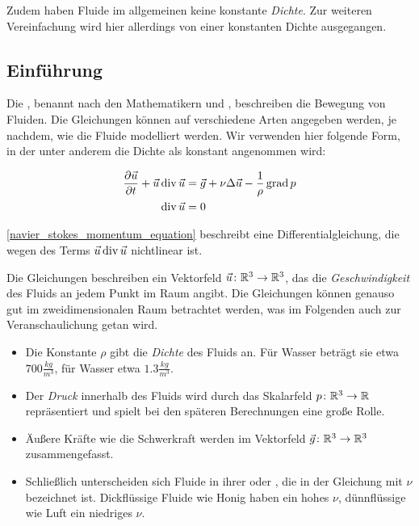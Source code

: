 Zudem haben Fluide im allgemeinen keine konstante \emph{Dichte}. Zur weiteren
Vereinfachung wird hier allerdings von einer konstanten Dichte ausgegangen.

\subsection{Einführung}

Die , benannt nach den Mathematikern
 und ,
beschreiben die Bewegung von Fluiden. Die Gleichungen können auf verschiedene
Arten angegeben werden, je nachdem, wie die Fluide modelliert werden. Wir
verwenden hier folgende Form, in der unter anderem die Dichte als konstant
angenommen wird:

\begin{align}
\label{navier_stokes_momentum_equation}
\frac{
	\partial
	\vec{u}
}
{
	\partial t
} +
\vec{u} \operatorname*{div} \vec{u}
& =
\vec{g} +
\nu \Delta \vec{u} -
\frac{
	1
}
{
	\rho
}
\operatorname*{grad} p
\\
\label{navier_stokes_incompressibility_condition}
\operatorname*{div} \vec{u} & = 0
\end{align}

\autoref{navier_stokes_momentum_equation} beschreibt eine Differentialgleichung,
die wegen des Terms $\vec{u} \operatorname*{div} \vec{u}$ nichtlinear ist.

Die Gleichungen beschreiben ein Vektorfeld $\vec{u} \colon \mathbb{R}^3 \to
\mathbb{R}^3$, das die \emph{Geschwindigkeit} des Fluids an jedem Punkt im
Raum angibt. Die Gleichungen können genauso gut im zweidimensionalen Raum
betrachtet werden, was im Folgenden auch zur Veranschaulichung getan wird.

\begin{itemize}
\item
	Die Konstante $\rho$ gibt die \emph{Dichte} des Fluids an. Für Wasser beträgt
	sie etwa $700 \frac{kg}{m^3}$, für Wasser etwa $1.3 \frac{kg}{m^3}$.
\item
	Der \emph{Druck} innerhalb des Fluids wird durch das Skalarfeld $p \colon
	\mathbb{R}^3 \to \mathbb{R}$ repräsentiert und spielt bei den späteren
	Berechnungen eine große Rolle.
\item
	Äußere Kräfte wie die Schwerkraft werden im Vektorfeld $\vec{g} \colon
	\mathbb{R}^3 \to \mathbb{R}^3$ zusammengefasst.
\item
	Schließlich unterscheiden sich Fluide in ihrer  oder
	, die in der Gleichung mit $\nu$ bezeichnet ist.
	Dickflüssige Fluide wie Honig haben ein hohes $\nu$, dünnflüssige wie Luft ein
	niedriges $\nu$.
\end{itemize}

